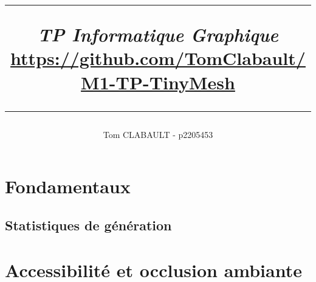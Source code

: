 \documentclass[11pt]{article}
\author{Tom CLABAULT - p2205453\\}
\title{
\noindent\rule{\textwidth}{1pt}
\textit{\textbf{TP Informatique Graphique}}\\
{\small \textcolor{blue}{\href{https://github.com/TomClabault/M1-TP-TinyMesh}{https://github.com/TomClabault/M1-TP-TinyMesh}}}
\noindent\rule{\textwidth}{1pt}
}
\date{}
\begin{document}
\maketitle

\section{Fondamentaux}
        	

	\subsection {Statistiques de génération}
		

\section {Accessibilité et occlusion ambiante}
	
\end{document}
